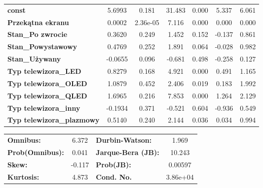\documentclass[11pt,a4paper]{article}
\begin{document}
\begin{center}
\begin{tabular}{lcccccc}
			\textbf{const}                    &       5.6993  &        0.181     &    31.483  &         0.000        &        5.337    &        6.061     \\
			\textbf{Przekątna ekranu}         &       0.0002  &     2.36e-05     &     7.116  &         0.000        &        0.000    &        0.000     \\
			\textbf{Stan\_Po zwrocie}         &       0.3620  &        0.249     &     1.452  &         0.152        &       -0.137    &        0.861     \\
			\textbf{Stan\_Powystawowy}        &       0.4769  &        0.252     &     1.891  &         0.064        &       -0.028    &        0.982     \\
			\textbf{Stan\_Używany}            &      -0.0655  &        0.096     &    -0.681  &         0.498        &       -0.258    &        0.127     \\
			\textbf{Typ telewizora\_LED}      &       0.8279  &        0.168     &     4.921  &         0.000        &        0.491    &        1.165     \\
			\textbf{Typ telewizora\_OLED}     &       1.0879  &        0.452     &     2.406  &         0.019        &        0.183    &        1.992     \\
			\textbf{Typ telewizora\_QLED}     &       1.6965  &        0.216     &     7.853  &         0.000        &        1.264    &        2.129     \\
			\textbf{Typ telewizora\_inny}     &      -0.1934  &        0.371     &    -0.521  &         0.604        &       -0.936    &        0.549     \\
			\textbf{Typ telewizora\_plazmowy} &       0.5140  &        0.240     &     2.144  &         0.036        &        0.034    &        0.994     \\
			 
	\end{tabular}
		\begin{tabular}{lclc}
			\textbf{Omnibus:}       &  6.372 & \textbf{  Durbin-Watson:     } &    1.969  \\
			\textbf{Prob(Omnibus):} &  0.041 & \textbf{  Jarque-Bera (JB):  } &   10.243  \\
			\textbf{Skew:}          & -0.117 & \textbf{  Prob(JB):          } &  0.00597  \\
			\textbf{Kurtosis:}      &  4.873 & \textbf{  Cond. No.          } & 3.86e+04  \\
			 
		\end{tabular}
	\end{center}
\end{document}
